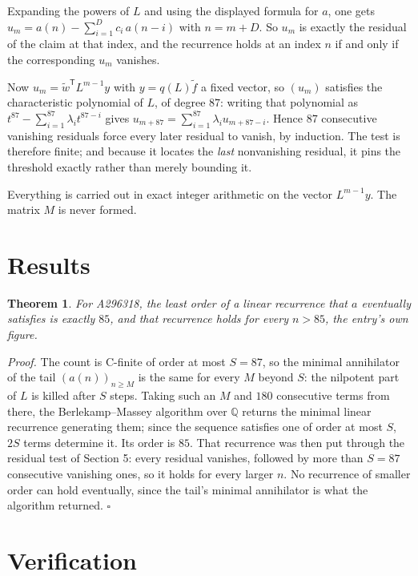 \documentclass[11pt]{article}
\newtheorem{theorem}{Theorem}
\theoremstyle{definition}
\begin{document}
Expanding the powers of $L$ and using the displayed formula for $a$, one gets $u_m = a(n) - \sum_{i=1}^{D} c_i\,a(n-i)$ with $n = m + D$. So $u_m$ is exactly the residual of the claim at that index, and the recurrence holds at an index $n$ if and only if the corresponding $u_m$ vanishes.

Now $u_m = \tilde w^{\mathsf T} L^{m-1} y$ with $y = q(L)\tilde f$ a fixed vector, so $(u_m)$ satisfies the characteristic polynomial of $L$, of degree $87$: writing that polynomial as $t^{87} - \sum_{i=1}^{87} \lambda_i t^{87-i}$ gives $u_{m+87} = \sum_{i=1}^{87} \lambda_i u_{m+87-i}$. Hence $87$ consecutive vanishing residuals force every later residual to vanish, by induction. The test is therefore finite; and because it locates the {\itshape last} nonvanishing residual, it pins the threshold exactly rather than merely bounding it.

Everything is carried out in exact integer arithmetic on the vector $L^{m-1}y$. The matrix $M$ is never formed.

\section{Results}

\begin{theorem} For A296318, the least order of a linear recurrence that $a$ eventually satisfies is exactly $85$, and that recurrence holds for every $n > 85$, the entry's own figure.\end{theorem}

{\itshape Proof.} The count is C-finite of order at most $S = 87$, so the minimal annihilator of the tail $(a(n))_{n \ge M}$ is the same for every $M$ beyond $S$: the nilpotent part of $L$ is killed after $S$ steps. Taking such an $M$ and $180$ consecutive terms from there, the Berlekamp--Massey algorithm over $\mathbb{Q}$ returns the minimal linear recurrence generating them; since the sequence satisfies one of order at most $S$, $2S$ terms determine it. Its order is $85$. That recurrence was then put through the residual test of Section 5: every residual vanishes, followed by more than $S = 87$ consecutive vanishing ones, so it holds for every larger $n$. No recurrence of smaller order can hold eventually, since the tail's minimal annihilator is what the algorithm returned. $\square$

\section{Verification}
\end{document}
